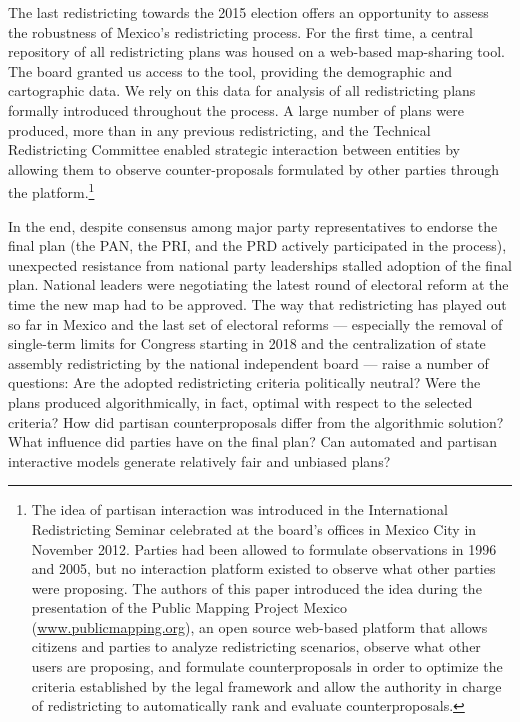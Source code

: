 \documentclass[letter,12pt]{article}
\begin{document}
The last redistricting towards the 2015 election offers an opportunity to assess the robustness of Mexico's redistricting process. For the first time, a central repository of all redistricting plans was housed on a web-based map-sharing tool. The board granted us access to the tool, providing the demographic and cartographic data. We rely on this data for analysis of all redistricting plans formally introduced throughout the process. A large number of plans were produced, more than in any previous redistricting, and the Technical Redistricting Committee enabled strategic interaction between entities by allowing them to observe counter-proposals formulated by other parties through the platform.\footnote{The idea of partisan interaction was introduced in the International Redistricting Seminar celebrated at the board's offices in Mexico City in November 2012. Parties had been allowed to formulate observations in 1996 and 2005, but no interaction platform existed to observe what other parties were proposing. The authors of this paper introduced the idea during the presentation of the Public Mapping Project Mexico (\url{www.publicmapping.org}), an open source web-based platform that allows citizens and parties to analyze redistricting scenarios, observe what other users are proposing, and formulate counterproposals in order to optimize the criteria established by the legal framework and allow the authority in charge of redistricting to automatically rank and evaluate counterproposals.} 

In the end, despite consensus among major party representatives to endorse the final plan (the PAN, the PRI, and the PRD actively participated in the process), unexpected resistance from national party leaderships stalled adoption of the final plan. National leaders were negotiating the latest round of electoral reform at the time the new map had to be approved. The way that redistricting has played out so far in Mexico and the last set of electoral reforms --- especially the removal of single-term limits for Congress starting in 2018 and the centralization of state assembly redistricting by the national independent board --- raise a number of questions: Are the adopted redistricting criteria politically neutral? Were the plans produced algorithmically, in fact, optimal with respect to the selected criteria? How did partisan counterproposals differ from the algorithmic solution? What influence did parties have on the final plan? Can automated and partisan interactive  models generate relatively fair and unbiased plans?
\end{document}
